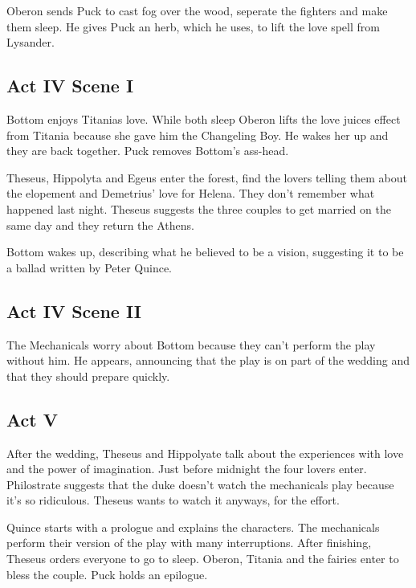 \documentclass{article}
\begin{document}
Oberon sends Puck to cast fog over the wood, seperate the fighters and make them sleep. He gives Puck an herb, which he uses, to lift the love spell from Lysander.
 
\subsection{Act IV Scene I}
Bottom enjoys Titanias love. While both sleep Oberon lifts the love juices effect from Titania because she gave him the Changeling Boy. He wakes her up and they are back together. Puck removes Bottom's ass-head.
 
Theseus, Hippolyta and Egeus enter the forest, find the lovers telling them about the elopement and Demetrius' love for Helena. They don't remember what happened last night.
Theseus suggests the three couples to get married on the same day and they return the Athens.
 
Bottom wakes up, describing what he believed to be a vision, suggesting it to be a ballad written by Peter Quince.  
 
\subsection{Act IV Scene II}
The Mechanicals worry about Bottom because they can't perform the play without him. He appears, announcing that the play is on part of the wedding and that they should prepare quickly. 
 
\subsection{Act V}
After the wedding, Theseus and Hippolyate talk about the experiences with love and the power of imagination. Just before midnight the four lovers enter. Philostrate suggests that the duke doesn't watch the mechanicals play because it's so ridiculous. Theseus wants to watch it anyways, for the effort.
 
Quince starts with a prologue and explains the characters. The mechanicals perform their version of the play with many interruptions. After finishing, Theseus orders everyone to go to sleep. Oberon, Titania and the fairies enter to bless the couple. Puck holds an epilogue.  
\end{document}
